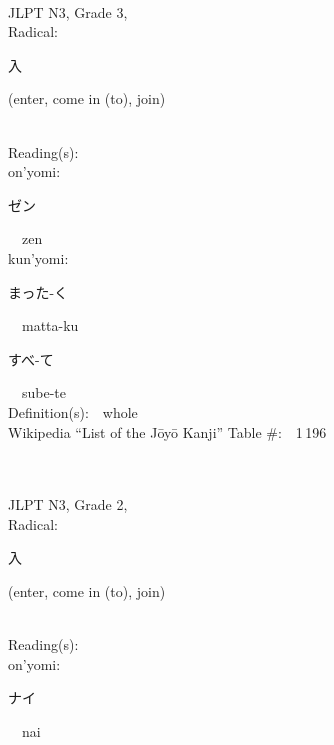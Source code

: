 \begin{multicols}{2}
{\fontsize{34pt}{40pt}  }\ \ \\  %
{JLPT N3, Grade 3, \\Radical:\ \ {\begin{CJK}{UTF8}{min} 入 \end{CJK}} (enter, come in (to), join) } \\
Reading(s):\ \ \\
{\hspace*{1em}}on'yomi:\ \ \\
{\hspace*{2em}}{\begin{CJK}{UTF8}{min} ゼン \end{CJK}}\ \ zen\ \ \\
{\hspace*{1em}}kun'yomi:\ \ \\
{\hspace*{2em}}{\begin{CJK}{UTF8}{min} まった-く \end{CJK}}\ \ matta-ku\ \ \\
{\hspace*{2em}}{\begin{CJK}{UTF8}{min} すべ-て \end{CJK}}\ \ sube-te\ \ \\
Definition(s):\ \ whole \\
Wikipedia ``List of the J\=oy\=o Kanji'' Table \#:\ \ 1\,196 \\
\ \ \\
{\fontsize{34pt}{40pt}  }\ \ \\  %
{JLPT N3, Grade 2, \\Radical:\ \ {\begin{CJK}{UTF8}{min} 入 \end{CJK}} (enter, come in (to), join) } \\
Reading(s):\ \ \\
{\hspace*{1em}}on'yomi:\ \ \\
{\hspace*{2em}}{\begin{CJK}{UTF8}{min} ナイ \end{CJK}}\ \ nai\ \ \\

\end{multicols}
